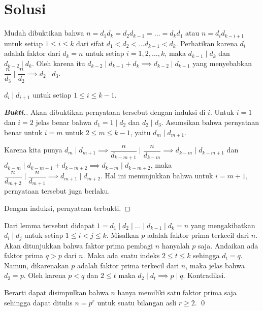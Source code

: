 \documentclass[12pt]{scrartcl}
\begin{document}
\section{Solusi}
Mudah dibuktikan bahwa $n = d_1 d_{k} = d_2d_{k-1} = \dots = d_k d_1$ atau $n = d_id_{k-i+1}$ untuk setiap $1 \le i \le k$ dari sifat $d_1 < d_2 < \dots d_{k-1} < d_k$. Perhatikan karena $d_i$ adalah faktor dari $d_k = n$ untuk setiap $i=1,2,\dots,k$, maka $d_{k-1} \mid d_k$ dan $d_{k-2} \mid d_k$. Oleh karena itu $d_{k-2} \mid d_{k-1} + d_k \implies d_{k-2} \mid d_{k-1}$ yang menyebabkan $\dfrac{n}{d_3} \mid \dfrac{n}{d_2} \implies d_2 \mid d_3$.

\begin{lemma*}
$d_i \mid d_{i+1}$ untuk setiap $1 \le i \le k-1$.
\begin{proof}[\textbf{Bukti.}] Akan dibuktikan pernyataan tersebut dengan induksi di $i$. Untuk $i=1$ dan $i=2$ jelas benar bahwa $d_1 = 1 \mid d_2$ dan $d_2 \mid d_3$. Asumsikan bahwa pernyataan benar untuk $i = m$ untuk $2 \le m \le k-1$, yaitu $d_m \mid d_{m+1}$. 

Karena kita punya $d_m \mid d_{m+1} \implies \dfrac{n}{d_{k-m+1}} \mid \dfrac{n}{d_{k-m}} \implies d_{k-m} \mid d_{k-m+1}$ dan  $d_{k-m} \mid d_{k-m+1} + d_{k-m+2} \implies d_{k-m}  \mid d_{k-m+2}$, maka $\dfrac{n}{d_{m+2}} \mid \dfrac{n}{d_{m+1}} \implies d_{m+1} \mid d_{m+2}$. Hal ini menunjukkan bahwa untuk $i=m+1$, pernyataan tersebut juga berlaku. 

Dengan induksi, pernyataan terbukti.
\end{proof}
\end{lemma*}

Dari lemma tersebut didapat $1 = d_1 \mid d_2 \mid \dots \mid d_{k-1} \mid d_k = n$ yang mengakibatkan $d_i \mid d_j$ untuk setiap $1 \le i < j \le k$. Misalkan $p$ adalah faktor prima terkecil dari $n$. Akan ditunjukkan bahwa faktor prima pembagi $n$ hanyalah $p$ saja. Andaikan ada faktor prima $q > p$ dari $n$. Maka ada suatu indeks $2 \le t \le k$ sehingga $d_t = q$. Namun, dikarenakan $p$ adalah faktor prima terkecil dari $n$, maka jelas bahwa $d_2 = p$. Oleh karena $p < q$ dan $2 \le t$ maka $d_2 \mid d_t \implies p \mid q$. Kontradiksi. 

Berarti dapat disimpulkan bahwa $n$ hanya memiliki satu faktor prima saja sehingga dapat ditulis $n = p^r$ untuk suatu bilangan asli $r \ge 2$. \qed
\end{document}
